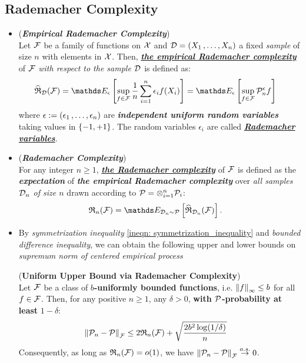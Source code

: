 \documentclass[11pt]{article}
\begin{document}
\subsection{Rademacher Complexity}
\begin{itemize}
\item \begin{definition} (\emph{\textbf{Empirical Rademacher Complexity}})\\
Let ${\mathcal F}$ be a family of functions on ${\mathcal X}$ and ${\mathcal D} = (X_1 \,{,}\ldots{,}\, X_n)$ a fixed \emph{sample} of size $n$ with elements in ${\mathcal X}$. Then, \underline{\emph{\textbf{the empirical Rademacher complexity}}} of ${\mathcal F}$ \emph{with respect to the sample ${\mathcal D}$} is defined as:
\begin{align}
\widehat{\mathfrak{R}}_{\cD}(\cF)&= \E{\epsilon}{\sup_{f \in \cF}\frac{1}{n}\sum_{i=1}^{n}\epsilon_{i}f(X_i)} = \E{\epsilon}{\sup_{f \in \cF} \cP_n^{\epsilon}f}  \label{eqn: rademacher_complexity}
\end{align}
where $\epsilon := (\epsilon_1 \,{,}\ldots{,}\, \epsilon_n)$ are  \textbf{\emph{independent uniform random variables}} taking values in $\left\{-1, +1\right\}$. The random variables $\epsilon_i$ are called \underline{\emph{\textbf{Rademacher variables}}}.
\end{definition}

\item \begin{definition} (\emph{\textbf{Rademacher Complexity}})\\
For any integer $n \ge 1$, \underline{\emph{\textbf{the Rademacher complexity}}} of ${\mathcal F}$ is defined as the \emph{\textbf{expectation}} of \emph{\textbf{the empirical Rademacher complexity}} over \emph{all samples ${\mathcal D}_n$ of size $n$} drawn according to ${\mathcal P} = \otimes_{i=1}^n{\mathcal P}_i$:
\begin{align*}
\frR_{n}(\cF) &= \E{\cD_n \sim \cP}{\widehat{\mathfrak{R}}_{\cD_n}(\cF)}.
\end{align*}
\end{definition}

\item By \emph{symmetrization inequality} \eqref{ineqn: symmetrization_inequality} and \emph{bounded difference inequality}, we can obtain the following upper and lower bounds on \emph{supremum norm of centered empirical process}
 \begin{proposition} \label{prop: radematcher_upper_bound} (\textbf{Uniform Upper Bound via Rademacher Complexity}) \citep{wainwright2019high}\\
Let ${\mathcal F}$ be a class of \textbf{$b$-uniformly bounded functions}, i.e. $\left\|f\right\|_{\infty} \le b$ for all $f \in {\mathcal F}$. Then, for any positive $n \ge 1$, any $\delta > 0$, \textbf{with ${\mathcal P}$-probability at least} $1 - \delta$:
\begin{align}
\left\|{\mathcal P}_n - {\mathcal P}\right\|_{{\mathcal F}} &\le  2 {\mathfrak R}_{n}({\mathcal F})  + \sqrt{\frac{2 b^2 \log(1 / \delta)}{n}} \label{eqn: Rademacher_upper_bound}
\end{align} Consequently, as long as ${\mathfrak R}_n({\mathcal F}) = o(1)$, we have $\left\|{\mathcal P}_n - {\mathcal P}\right\|_{{\mathcal F}} \stackrel{a.s.}{\to} 0$.
\end{proposition}


\end{itemize}
\end{document}
